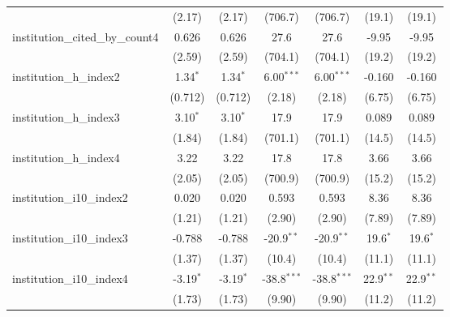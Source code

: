 \begin{tabular}{lcccccc}
                                         & (2.17)        & (2.17)        & (706.7)       & (706.7)       & (19.1)        & (19.1)\\   
   institution\_cited\_by\_count4        & 0.626         & 0.626         & 27.6          & 27.6          & -9.95         & -9.95\\   
                                         & (2.59)        & (2.59)        & (704.1)       & (704.1)       & (19.2)        & (19.2)\\   
   institution\_h\_index2                & 1.34$^{*}$    & 1.34$^{*}$    & 6.00$^{***}$  & 6.00$^{***}$  & -0.160        & -0.160\\   
                                         & (0.712)       & (0.712)       & (2.18)        & (2.18)        & (6.75)        & (6.75)\\   
   institution\_h\_index3                & 3.10$^{*}$    & 3.10$^{*}$    & 17.9          & 17.9          & 0.089         & 0.089\\   
                                         & (1.84)        & (1.84)        & (701.1)       & (701.1)       & (14.5)        & (14.5)\\   
   institution\_h\_index4                & 3.22          & 3.22          & 17.8          & 17.8          & 3.66          & 3.66\\   
                                         & (2.05)        & (2.05)        & (700.9)       & (700.9)       & (15.2)        & (15.2)\\   
   institution\_i10\_index2              & 0.020         & 0.020         & 0.593         & 0.593         & 8.36          & 8.36\\   
                                         & (1.21)        & (1.21)        & (2.90)        & (2.90)        & (7.89)        & (7.89)\\   
   institution\_i10\_index3              & -0.788        & -0.788        & -20.9$^{**}$  & -20.9$^{**}$  & 19.6$^{*}$    & 19.6$^{*}$\\   
                                         & (1.37)        & (1.37)        & (10.4)        & (10.4)        & (11.1)        & (11.1)\\   
   institution\_i10\_index4              & -3.19$^{*}$   & -3.19$^{*}$   & -38.8$^{***}$ & -38.8$^{***}$ & 22.9$^{**}$   & 22.9$^{**}$\\   
                                         & (1.73)        & (1.73)        & (9.90)        & (9.90)        & (11.2)        & (11.2)\\   

\end{tabular}
